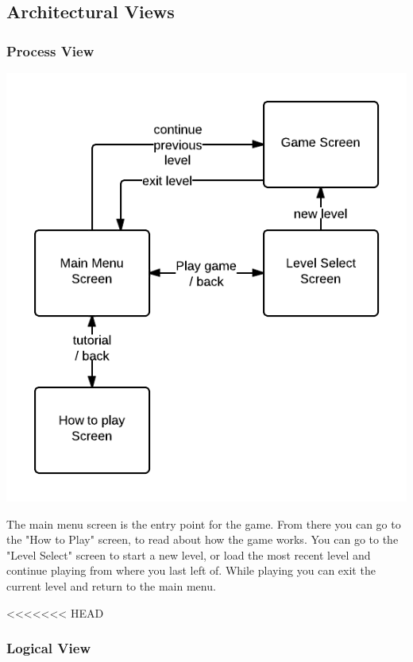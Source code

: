\subsection{Architectural Views}

\subsubsection*{Process View}

\includegraphics[width=\textwidth]{pictures/process_view_screen_flow}

The main menu screen is the entry point for the game. From there you can go to the "How to Play" screen, 
to read about how the game works. You can go to the "Level Select" screen to start a new level, or load the 
most recent level and continue playing from where you last left of. While playing you can exit the current 
level and return to the main menu.

<<<<<<< HEAD
\subsubsection*{Logical View}

